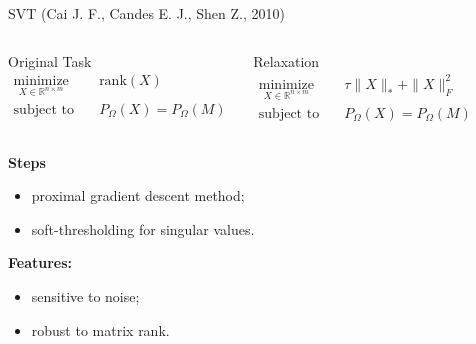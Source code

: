 \documentclass{beamer}
\begin{document}
\begin{frame}{SVT (Cai J. F., Candes E. J., Shen Z., 2010)}
	\begin{columns}[c]
		\begin{block}{Original Task}
			\vspace{-0.5cm}
			\begin{align*}
			\mathop{\text{minimize}}\limits_{X \in \mathbb{R}^{n \times m}} \quad & 
			\text{rank} (X) \\
			\text{subject to} \quad & P_{\Omega} (X) = P_{\Omega} (M)
			\end{align*}
		\end{block}
		
		\begin{block}{Relaxation}
			\vspace{-0.5cm}
			\begin{align*}
			\mathop{\text{minimize}}\limits_{X \in \mathbb{R}^{n \times m}} \quad & \tau \| X \|_* + \| X \|_F^2 \\
			\text{subject to} \quad & P_{\Omega} (X) = P_{\Omega} (M)
			\end{align*}
		\end{block}
	\end{columns}
	\vspace{0.3cm}
	\textbf{Steps}
	
	\begin{itemize}
		\item proximal gradient descent method;
		\item soft-thresholding for singular values.
	\end{itemize}
	\textbf{Features:}
	\begin{itemize}
		\item sensitive to noise;
		\item robust to matrix rank.
	\end{itemize}
	
\end{frame}
\end{document}
